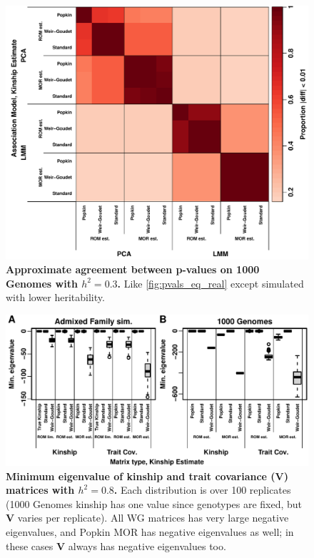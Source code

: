 \documentclass[11pt]{article}
\begin{document}
\begin{figure}[bp!]
  \centering
  \includegraphics[width=\textwidth]{tgp-nygc-autosomes_ld_prune_1000kb_0.3_maf-0.01/h-0.3/pvals_eq.pdf}
  \caption{
    {\bf Approximate agreement between p-values on 1000 Genomes with $h^2=0.3$.}
    Like \cref{fig:pvals_eq_real} except simulated with lower heritability.
  }
  \label{fig:pvals_eq_real-h3}
\end{figure}

\begin{figure}[bp!]
  \centering
  \includegraphics[width=\textwidth]{emin.pdf}
  \caption{
    {\bf Minimum eigenvalue of kinship and trait covariance ($\mathbf{V}$) matrices with $h^2=0.8$.}
    Each distribution is over 100 replicates (1000 Genomes kinship has one value since genotypes are fixed, but $\mathbf{V}$ varies per replicate).
    All WG matrices has very large negative eigenvalues, and Popkin MOR has negative eigenvalues as well; in these cases $\mathbf{V}$ always has negative eigenvalues too.
  }
  \label{fig:emin}
\end{figure}
\end{document}
